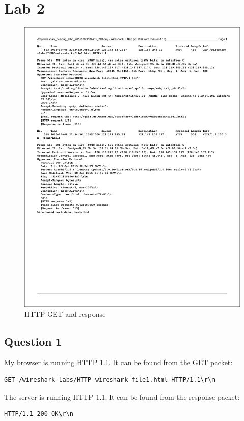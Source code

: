 \documentclass[titlepage, paper=a4, fontsize=11pt]{scrartcl} %
\numberwithin{equation}{section} %
\numberwithin{figure}{section} %
\numberwithin{table}{section} %
\begin{document}
\section*{\textbf{Lab 2}}
\begin{figure}[!ht]
    \centering
    \includegraphics[width=\textwidth]{images/http-cap.pdf}
    \caption{HTTP GET and response}
    \label{fig:http}
\end{figure}

\subsection*{Question 1}
My browser is running HTTP 1.1. It can be found from the GET packet:
\begin{verbatim}
GET /wireshark-labs/HTTP-wireshark-file1.html HTTP/1.1\r\n
\end{verbatim}

The server is running HTTP 1.1. It can be found from the response packet:
\begin{verbatim}
HTTP/1.1 200 OK\r\n
\end{verbatim}
\end{document}
